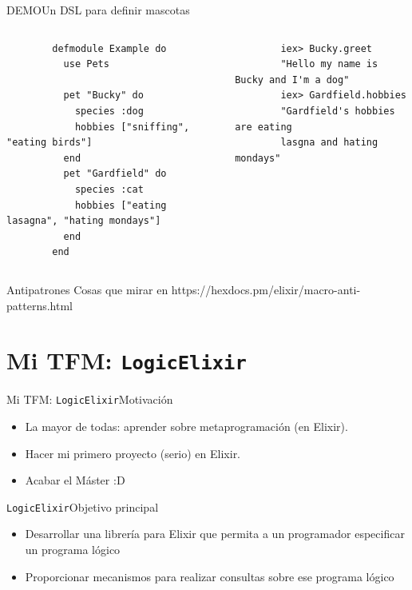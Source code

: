 \documentclass[14pt,aspectratio=169]{beamer}
\begin{document}
\begin{frame}[fragile]{DEMO}{Un DSL para definir mascotas}
  \begin{columns}
    \begin{column}{0.5\textwidth}
      \scriptsize\begin{verbatim}
        defmodule Example do
          use Pets

          pet "Bucky" do
            species :dog
            hobbies ["sniffing", "eating birds"]
          end
          pet "Gardfield" do
            species :cat
            hobbies ["eating lasagna", "hating mondays"]
          end
        end
      \end{verbatim}
    \end{column}
    \begin{column}{0.5\textwidth}
      \scriptsize\begin{verbatim}
        iex> Bucky.greet
        "Hello my name is Bucky and I'm a dog"
        iex> Gardfield.hobbies
        "Gardfield's hobbies are eating
        lasgna and hating mondays"
      \end{verbatim}
    \end{column}
  \end{columns}
\end{frame}

\begin{frame}{Antipatrones}
  Cosas que mirar en https://hexdocs.pm/elixir/macro-anti-patterns.html
\end{frame}

\section{Mi TFM: \texttt{LogicElixir}}
\begin{frame}{Mi TFM: \texttt{LogicElixir}}{Motivación}
  \begin{itemize}
    \item La mayor de todas: aprender sobre metaprogramación (en Elixir).
    \item Hacer mi primero proyecto (serio) en Elixir.
    \item Acabar el Máster :D
  \end{itemize}
\end{frame}

\begin{frame}{\texttt{LogicElixir}}{Objetivo principal}
  \begin{itemize}
    \item Desarrollar una librería para Elixir que permita
    a un programador especificar un programa lógico
    \item Proporcionar mecanismos para realizar consultas sobre
    ese programa lógico
  \end{itemize}
\end{frame}
\end{document}
